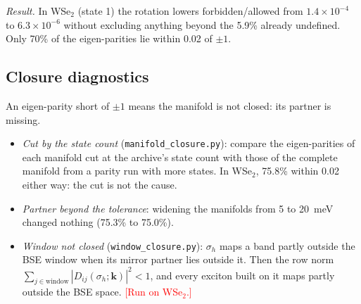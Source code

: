 \documentclass[10pt,a4paper]{article}
\newcommand{\tbd}[1]{\textcolor{red}{[#1]}}
\newcommand{\bk}{\mathbf{k}}
\begin{document}
\emph{Result.} In WSe$_2$ (state 1) the rotation lowers forbidden/allowed from
$1.4\times10^{-4}$ to $6.3\times10^{-6}$ without excluding anything beyond the 5.9\%
already undefined. Only 70\% of the eigen-parities lie within 0.02 of $\pm1$.

\subsection{Closure diagnostics}
An eigen-parity short of $\pm1$ means the manifold is not closed: its partner is
missing.
\begin{itemize}[nosep,leftmargin=1.2em]
\item \emph{Cut by the state count} (\texttt{manifold\_closure.py}): compare the
eigen-parities of each manifold cut at the archive's state count with those of
the complete manifold from a parity run with more states. In WSe$_2$, 75.8\%
within 0.02 either way: the cut is not the cause.
\item \emph{Partner beyond the tolerance}: widening the manifolds from 5 to
20~meV changed nothing (75.3\% to 75.0\%).
\item \emph{Window not closed} (\texttt{window\_closure.py}): $\sigma_h$ maps a band
partly outside the BSE window when its mirror partner lies outside it. Then the
row norm $\sum_{j\in\mathrm{window}}|D_{ij}(\sigma_h;\bk)|^2<1$, and every exciton
built on it maps partly outside the BSE space. \tbd{Run on WSe$_2$.}
\end{itemize}


\end{document}
